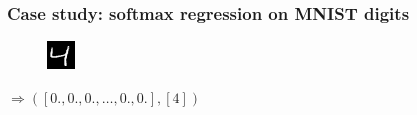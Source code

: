 \documentclass[mathserif, xcolor=dvipsnames]{beamer}
\begin{document}
\begin{frame}[t]
    \frametitle{Case study: softmax regression on MNIST digits}

    \begin{center}
    \begin{minipage}{0.05\textwidth}
    \begin{figure}[H]
        \raggedleft
        \includegraphics[width=\textwidth]{mnist_4.png}
    \end{figure}
    \end{minipage}
    \begin{minipage}{0.9\textwidth}
        \raggedright
        $\Rightarrow ([0., 0., 0., \ldots, 0., 0.],
                      [4])$
    \end{minipage}
    \end{center}


\end{frame}
\end{document}
